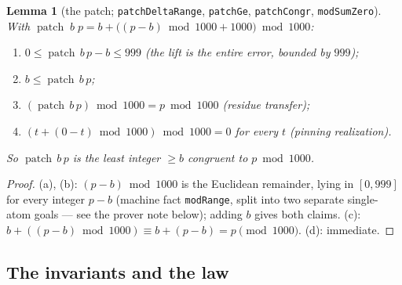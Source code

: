 \documentclass[11pt]{article}
\newcommand{\patch}{\operatorname{patch}}
\theoremstyle{plain}
\newtheorem{lemma}{Lemma}[section]
\theoremstyle{definition}
\begin{document}
\begin{lemma}[the patch; \texttt{patchDeltaRange}, \texttt{patchGe}, \texttt{patchCongr}, \texttt{modSumZero}]\label{lem:patch}
With $\patch\;b\;p=b+\bigl((p-b)\bmod 1000+1000\bigr)\bmod 1000$:
\begin{enumerate}
\item[(a)] $0\le\patch\,b\,p-b\le 999$ \emph{(the lift is the entire error, bounded by $999$)};
\item[(b)] $b\le\patch\,b\,p$;
\item[(c)] $(\patch\,b\,p)\bmod 1000=p\bmod 1000$ \emph{(residue transfer)};
\item[(d)] $(t+(0-t)\bmod 1000)\bmod 1000=0$ for every $t$ \emph{(pinning realization)}.
\end{enumerate}
So $\patch\,b\,p$ is the least integer $\ge b$ congruent to $p\bmod 1000$.
\end{lemma}
\begin{proof}
(a), (b): $(p-b)\bmod 1000$ is the Euclidean remainder, lying in $[0,999]$ for every
integer $p-b$ (machine fact \texttt{modRange}, split into two separate single-atom goals
--- see the prover note below); adding $b$ gives both claims. (c):
$b+((p-b)\bmod 1000)\equiv b+(p-b)=p\pmod{1000}$. (d): immediate.
\end{proof}

\subsection{The invariants and the law}
\end{document}
